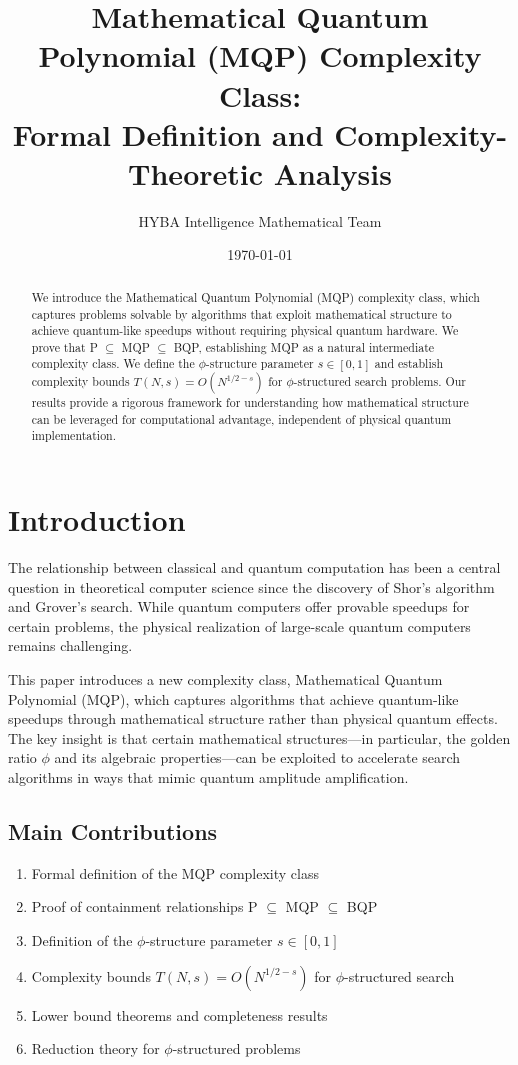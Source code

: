 \documentclass{article}
\title{Mathematical Quantum Polynomial (MQP) Complexity Class: \\ Formal Definition and Complexity-Theoretic Analysis}
\author{HYBA Intelligence Mathematical Team}
\date{\today}
\theoremstyle{remark}
\begin{document}
\maketitle

\begin{abstract}
We introduce the Mathematical Quantum Polynomial (MQP) complexity class, which captures problems solvable by algorithms that exploit mathematical structure to achieve quantum-like speedups without requiring physical quantum hardware. We prove that P $\subseteq$ MQP $\subseteq$ BQP, establishing MQP as a natural intermediate complexity class. We define the $\phi$-structure parameter $s \in [0,1]$ and establish complexity bounds $T(N,s) = O(N^{1/2-s})$ for $\phi$-structured search problems. Our results provide a rigorous framework for understanding how mathematical structure can be leveraged for computational advantage, independent of physical quantum implementation.
\end{abstract}

\section{Introduction}

The relationship between classical and quantum computation has been a central question in theoretical computer science since the discovery of Shor's algorithm and Grover's search. While quantum computers offer provable speedups for certain problems, the physical realization of large-scale quantum computers remains challenging.

This paper introduces a new complexity class, Mathematical Quantum Polynomial (MQP), which captures algorithms that achieve quantum-like speedups through mathematical structure rather than physical quantum effects. The key insight is that certain mathematical structures---in particular, the golden ratio $\phi$ and its algebraic properties---can be exploited to accelerate search algorithms in ways that mimic quantum amplitude amplification.

\subsection{Main Contributions}

\begin{enumerate}
\item Formal definition of the MQP complexity class
\item Proof of containment relationships P $\subseteq$ MQP $\subseteq$ BQP
\item Definition of the $\phi$-structure parameter $s \in [0,1]$
\item Complexity bounds $T(N,s) = O(N^{1/2-s})$ for $\phi$-structured search
\item Lower bound theorems and completeness results
\item Reduction theory for $\phi$-structured problems
\end{enumerate}
\end{document}
